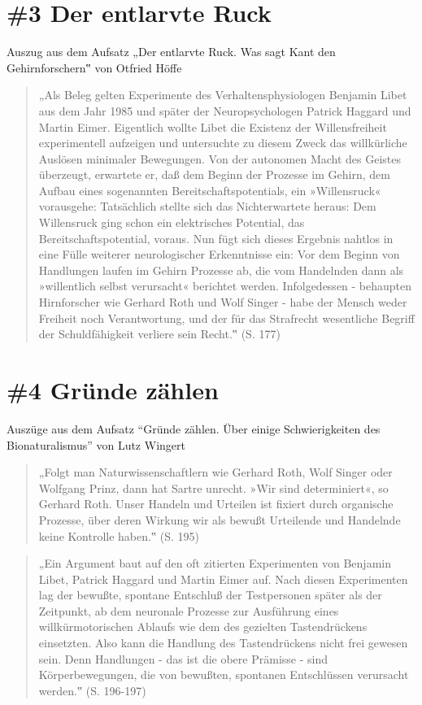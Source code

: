 \documentclass[
  a4paper,
]{report}
\begin{document}
\hypertarget{def-ev3}{%
\section{\#3 Der entlarvte Ruck}\label{def-ev3}}

Auszug aus dem Aufsatz „Der entlarvte Ruck. Was sagt Kant den Gehirnforschern‟ von Otfried Höffe \citeyearpar{Höffe2004}

\begin{quote}
„Als Beleg gelten Experimente des Verhaltensphysiologen Benjamin Libet aus dem Jahr 1985 und später der Neuropsychologen Patrick Haggard und Martin Eimer. Eigentlich wollte Libet die Existenz der Willensfreiheit experimentell aufzeigen und untersuchte zu diesem Zweck das willkürliche Auslösen minimaler Bewegungen. Von der autonomen Macht des Geistes überzeugt, erwartete er, daß dem Beginn der Prozesse im Gehirn, dem Aufbau eines sogenannten Bereitschaftspotentials, ein »Willensruck« vorausgehe: Tatsächlich stellte sich das Nichterwartete heraus: Dem Willensruck ging schon ein elektrisches Potential, das Bereitschaftspotential, voraus. Nun fügt sich dieses Ergebnis nahtlos in eine Fülle weiterer neurologischer Erkenntnisse ein: Vor dem Beginn von Handlungen laufen im Gehirn Prozesse ab, die vom Handelnden dann als »willentlich selbst verursacht« berichtet werden. Infolgedessen - behaupten Hirnforscher wie Gerhard Roth und Wolf Singer - habe der Mensch weder Freiheit noch Verantwortung, und der für das Strafrecht wesentliche Begriff der Schuldfähigkeit verliere sein Recht.‟ (S. 177)
\end{quote}

\hypertarget{def-ev4}{%
\section{\#4 Gründe zählen}\label{def-ev4}}

Auszüge aus dem Aufsatz ``Gründe zählen. Über einige Schwierigkeiten des Bionaturalismus'' von Lutz Wingert \citeyearpar{Lutz2004}

\begin{quote}
„Folgt man Naturwissenschaftlern wie Gerhard Roth, Wolf Singer oder Wolfgang Prinz, dann hat Sartre unrecht. »Wir sind determiniert«, so Gerhard Roth. Unser Handeln und Urteilen ist fixiert durch organische Prozesse, über deren Wirkung wir als bewußt Urteilende und Handelnde keine Kontrolle haben.‟ (S. 195)
\end{quote}

\begin{quote}
„Ein Argument baut auf den oft zitierten Experimenten von Benjamin Libet, Patrick Haggard und Martin Eimer auf. Nach diesen Experimenten lag der bewußte, spontane Entschluß der Testpersonen später als der Zeitpunkt, ab dem neuronale Prozesse zur Ausführung eines willkürmotorischen Ablaufs wie dem des gezielten Tastendrückens einsetzten. Also kann die Handlung des Tastendrückens nicht frei gewesen sein. Denn Handlungen - das ist die obere Prämisse - sind Körperbewegungen, die von bewußten, spontanen Entschlüssen verursacht werden.‟ (S. 196-197)
\end{quote}
\end{document}
